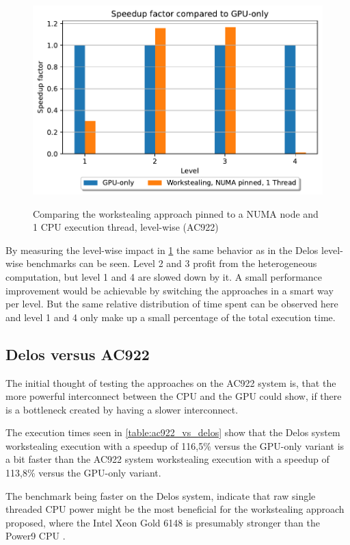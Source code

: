 \begin{figure}[H]
  \caption{Comparing the workstealing approach pinned to a NUMA node and 1 CPU execution thread, level-wise (AC922)}
  \includegraphics[width=\textwidth]{figures/ac922_levelwise.pdf}
  \centering
  \label{fig:levelwise_ac922}
\end{figure}

By measuring the level-wise impact in \ref{fig:levelwise_ac922} the same behavior as in the Delos level-wise benchmarks can be seen. Level 2 and 3 profit from the heterogeneous computation, but level 1 and 4 are slowed down by it. A small performance improvement would be achievable by switching the approaches in a smart way per level. But the same relative distribution of time spent can be observed here and level 1 and 4 only make up a small percentage of the total execution time.

\subsection{Delos versus AC922}
The initial thought of testing the approaches on the AC922 system is, that the more powerful interconnect between the CPU and the GPU could show, if there is a bottleneck created by having a slower interconnect.



The execution times seen in \ref{table:ac922_vs_delos} show that the Delos system workstealing execution with a speedup of 116,5\% versus the GPU-only variant is a bit faster than the AC922 system workstealing execution with a speedup of 113,8\% versus the GPU-only variant.

The benchmark being faster on the Delos system, indicate that raw single threaded CPU power might be the most beneficial for the workstealing approach proposed, where the Intel Xeon Gold 6148 is presumably stronger than the Power9 CPU \cite{POWER9BenchmarksVs}.

